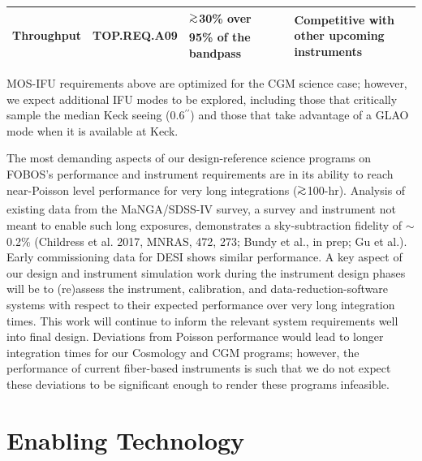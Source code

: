 \documentclass[oneside,11pt]{amsart}
\newcommand{\arcsec}{\mbox{$^{\prime\prime}$}}
\DeclareRobustCommand{\gtrsim}{%
\mathrel{\hskip-.5em\begin{array}{c}>\\[-8pt]\sim\end{array}\hskip-.5em}}
\begin{document}
\begin{table}[h!]
\begin{threeparttable}
\begin{tabular}{| l | c | p{2.5cm} | p{1.5cm} | p{4cm} |}
\hline
Throughput & TOP.REQ.A09 & $\gtrsim$30\% over 95\% of the bandpass & & Competitive with other upcoming instruments \\
\hline
\end{tabular}
\begin{tablenotes}
\item MOS-IFU requirements above are optimized for the CGM science
case; however, we expect additional IFU modes to be explored,
including those that critically sample the median Keck seeing
(0.6\arcsec) and those that take advantage of a GLAO mode when it is
available at Keck.
\end{tablenotes} 
\label{tab:reqs}
\end{threeparttable}
\end{table}

The most demanding aspects of our design-reference science programs
on FOBOS's performance and instrument requirements are in its ability
to reach near-Poisson level performance for very long integrations
($\gtrsim$100-hr). Analysis of existing data from the MaNGA/SDSS-IV
survey, a survey and instrument not meant to enable such long
exposures, demonstrates a sky-subtraction fidelity of $\sim$0.2\%
(Childress et al. 2017, MNRAS, 472, 273; Bundy et al., in prep; Gu et
al.). Early commissioning data for DESI shows similar performance. A
key aspect of our design and instrument simulation work during the
instrument design phases will be to (re)assess the instrument,
calibration, and data-reduction-software systems with respect to
their expected performance over very long integration times. This
work will continue to inform the relevant system requirements well
into final design. Deviations from Poisson performance would lead to
longer integration times for our Cosmology and CGM programs; however,
the performance of current fiber-based instruments is such that we do
not expect these deviations to be significant enough to render these
programs infeasible.


\section{Enabling Technology}
\label{sec:tech}
\end{document}

